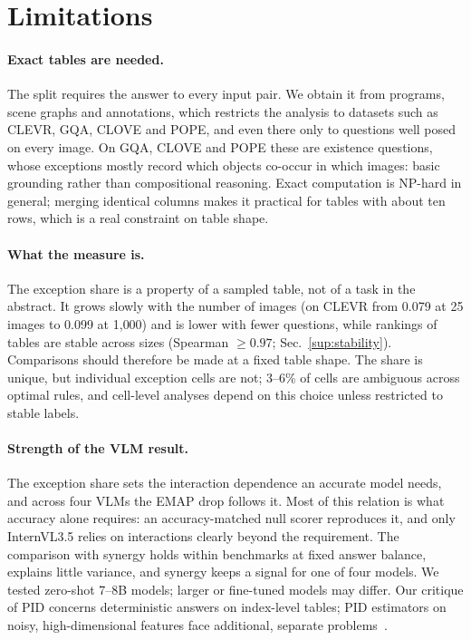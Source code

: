 \section{Limitations}
\label{sec:limits}

\paragraph{Exact tables are needed.}
The split requires the answer to every input pair. We obtain it from programs, scene graphs and annotations, which
restricts the analysis to datasets such as CLEVR, GQA, CLOVE and POPE, and even there only to questions well posed on
every image. On GQA, CLOVE and POPE these are existence questions, whose exceptions mostly record which objects
co-occur in which images: basic grounding rather than compositional reasoning. Exact computation is NP-hard in general;
merging identical columns makes it practical for tables with about ten rows, which is a real constraint on table shape.

\paragraph{What the measure is.}
The exception share is a property of a sampled table, not of a task in the abstract. It grows slowly with the number of
images (on CLEVR from 0.079 at 25 images to 0.099 at 1{,}000) and is lower with fewer questions, while rankings of tables
are stable across sizes (Spearman $\ge0.97$; Sec.~\ref{sup:stability}). Comparisons should therefore be made at a fixed
table shape. The share is unique, but individual exception cells are not; 3--6\% of cells are ambiguous across optimal
rules, and cell-level analyses depend on this choice unless restricted to stable labels.

\paragraph{Strength of the VLM result.}
The exception share sets the interaction dependence an accurate model needs, and across four VLMs the EMAP drop follows
it. Most of this relation is what accuracy alone requires: an accuracy-matched null scorer reproduces it, and only
InternVL3.5 relies on interactions clearly beyond the requirement. The comparison with synergy holds within benchmarks
at fixed answer balance, explains little variance, and synergy keeps a signal for one of four models. We tested
zero-shot 7--8B models; larger or fine-tuned models may differ. Our critique of PID concerns deterministic answers on
index-level tables; PID estimators on noisy, high-dimensional features face additional, separate
problems~\cite{liang2023quantifying}.

